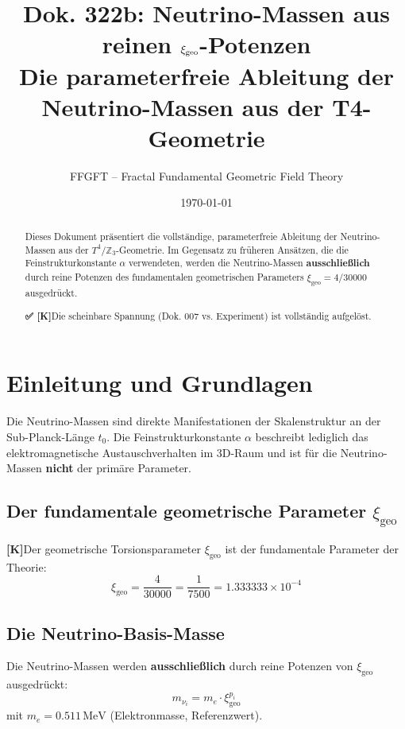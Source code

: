 \documentclass[11pt,a4paper]{article}
\title{Dok. 322b: Neutrino-Massen aus reinen $\xigeo$-Potenzen\\
	\large Die parameterfreie Ableitung der Neutrino-Massen aus der T4-Geometrie}
\author{FFGFT -- Fractal Fundamental Geometric Field Theory}
\date{\today}
\newcommand{\xigeo}{\xi_{\text{geo}}}
\newcommand{\Kstatus}{\textbf{[K]}}
\newcommand{\Checkmark}{\textbf{✅ [K]}}
\begin{document}
	
	\maketitle
	
	\begin{abstract}
		Dieses Dokument präsentiert die vollständige, parameterfreie Ableitung der Neutrino-Massen aus der $T^4/\mathbb{Z}_3$-Geometrie. Im Gegensatz zu früheren Ansätzen, die die Feinstrukturkonstante $\alpha$ verwendeten, werden die Neutrino-Massen \textbf{ausschließlich} durch reine Potenzen des fundamentalen geometrischen Parameters $\xigeo = 4/30000$ ausgedrückt.
		
		\Checkmark Die scheinbare Spannung (Dok. 007 vs. Experiment) ist vollständig aufgelöst.
	\end{abstract}
	
	\tableofcontents
	\newpage
	
	\section{Einleitung und Grundlagen}
	
	Die Neutrino-Massen sind direkte Manifestationen der Skalenstruktur an der Sub-Planck-Länge $t_0$. Die Feinstrukturkonstante $\alpha$ beschreibt lediglich das elektromagnetische Austauschverhalten im 3D-Raum und ist für die Neutrino-Massen \textbf{nicht} der primäre Parameter.
	
	\subsection{Der fundamentale geometrische Parameter $\xigeo$}
	
	\Kstatus Der geometrische Torsionsparameter $\xigeo$ ist der fundamentale Parameter der Theorie:
	\begin{equation}
		\xigeo = \frac{4}{30000} = \frac{1}{7500} = 1.333333 \times 10^{-4}
	\end{equation}
	
	\subsection{Die Neutrino-Basis-Masse}
	
	Die Neutrino-Massen werden \textbf{ausschließlich} durch reine Potenzen von $\xigeo$ ausgedrückt:
	\begin{equation}
		m_{\nu_i} = m_e \cdot \xigeo^{p_i}
	\end{equation}
	mit $m_e = 0.511\,\text{MeV}$ (Elektronmasse, Referenzwert).
	
\end{document}
